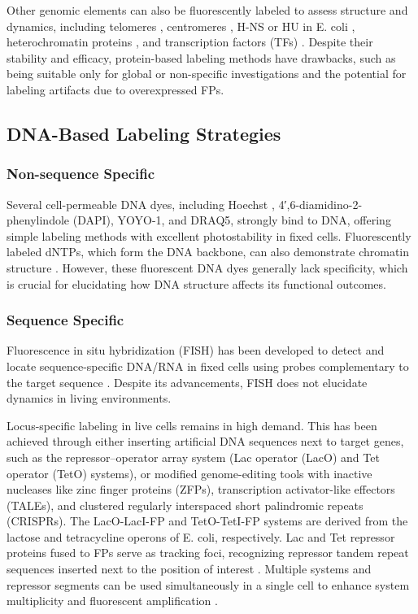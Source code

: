 Other genomic elements can also be fluorescently labeled to assess structure and dynamics, including telomeres \parencite{Avogaro2018}, centromeres \parencite{Avogaro2018,Gasser2002}, H-NS or HU in E. coli \parencite{Wang2011}, heterochromatin proteins \parencite{Hu2013}, and transcription factors (TFs) \parencite{Elf2007,Gebhardt2013}. Despite their stability and efficacy, protein-based labeling methods have drawbacks, such as being suitable only for global or non-specific investigations and the potential for labeling artifacts due to overexpressed FPs.

\subsection{DNA-Based Labeling Strategies}

\subsubsection{Non-sequence Specific}

Several cell-permeable DNA dyes, including Hoechst \parencite{Green2017}, 4′,6-diamidino-2-phenylindole (DAPI), YOYO-1, and DRAQ5, strongly bind to DNA, offering simple labeling methods with excellent photostability in fixed cells. Fluorescently labeled dNTPs, which form the DNA backbone, can also demonstrate chromatin structure \parencite{Bu2019}. However, these fluorescent DNA dyes generally lack specificity, which is crucial for elucidating how DNA structure affects its functional outcomes.

\subsubsection{Sequence Specific}

Fluorescence in situ hybridization (FISH) has been developed to detect and locate sequence-specific DNA/RNA in fixed cells using probes complementary to the target sequence \parencite{Bayani2004,Beliveau2015}. Despite its advancements, FISH does not elucidate dynamics in living environments.

Locus-specific labeling in live cells remains in high demand. This has been achieved through either inserting artificial DNA sequences next to target genes, such as the repressor–operator array system (Lac operator (LacO) and Tet operator (TetO) systems), or modified genome-editing tools with inactive nucleases like zinc finger proteins (ZFPs), transcription activator-like effectors (TALEs), and clustered regularly interspaced short palindromic repeats (CRISPRs). The LacO-LacI-FP and TetO-TetI-FP systems are derived from the lactose and tetracycline operons of E. coli, respectively. Lac and Tet repressor proteins fused to FPs serve as tracking foci, recognizing repressor tandem repeat sequences inserted next to the position of interest \parencite{Ding2017,Loiodice2014}. Multiple systems and repressor segments can be used simultaneously in a single cell to enhance system multiplicity and fluorescent amplification \parencite{Backlund2014,Roukos2013,Tasan2018}.

